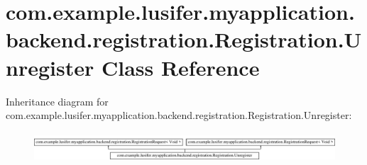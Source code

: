 \hypertarget{classcom_1_1example_1_1lusifer_1_1myapplication_1_1backend_1_1registration_1_1_registration_1_1_unregister}{}\section{com.\+example.\+lusifer.\+myapplication.\+backend.\+registration.\+Registration.\+Unregister Class Reference}
\label{classcom_1_1example_1_1lusifer_1_1myapplication_1_1backend_1_1registration_1_1_registration_1_1_unregister}
Inheritance diagram for com.\+example.\+lusifer.\+myapplication.\+backend.\+registration.\+Registration.\+Unregister\+:\begin{figure}[H]
\begin{center}
\leavevmode
\includegraphics[height=1.129032cm]{classcom_1_1example_1_1lusifer_1_1myapplication_1_1backend_1_1registration_1_1_registration_1_1_unregister}
\end{center}
\end{figure}
